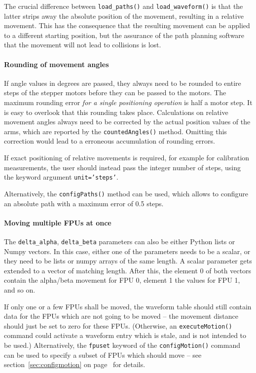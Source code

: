 \documentclass[11pt,a4paper]{report}
\begin{document}
The crucial difference between \texttt{load\_paths()} and
\texttt{load\_waveform()} is that the latter strips away the absolute
position of the movement, resulting in a relative movement.  This has
the consequence that the resulting movement can be applied to a
different starting position, but the assurance of the path planning
software that the movement will not lead to collisions is lost.


\paragraph{Rounding of movement angles}
%
%
If angle values in degrees are passed, they always need to be rounded
to entire steps of the stepper motors before they can be passed to the
motors.  The maximum rounding error \emph{for a single positioning
  operation} is half a motor step.  It is easy to overlook that this
rounding takes place.  Calculations on relative movement angles always
need to be corrected by the actual position values of the arms, which
are reported by the \texttt{countedAngles()} method. Omitting this
correction would lead to a erroneous accumulation of rounding errors.

If exact positioning of relative movements is required, for example
for calibration measurements, the user should instead pass the integer
number of steps, using the keyword argument \texttt{unit='steps'}.

Alternatively, the \texttt{configPaths()} method can be used, which
allows to configure an absolute path with a maximum error of 0.5
steps.

\paragraph{Moving multiple FPUs at once}
 The
\verb+delta_alpha+, \verb+delta_beta+ parameters can also be either
Python lists or Numpy vectors. In this case, either one of the
parameters needs to be a scalar, or they need to be lists or numpy
arrays of the same length. A scalar parameter gets extended to a
vector of matching length. After this, the element 0 of both vectors
contain the alpha/beta movement for FPU 0, element 1 the values for
FPU 1, and so on.

If only one or a few FPUs shall be moved, the waveform table should
still contain data for the FPUs which are not going to be moved -- the
movement distance should just be set to zero for these FPUs.
(Otherwise, an \texttt{executeMotion()} command could activate a
waveform entry which is stale, and is not intended to be used.)
Alternatively, the \texttt{fpuset} keyword of the
\texttt{configMotion()} command can be used to specify a subset of FPUs
which should move -- see section~\ref{sec:configmotion} on
page~\pageref{sec:configmotion} for details.
\end{document}
